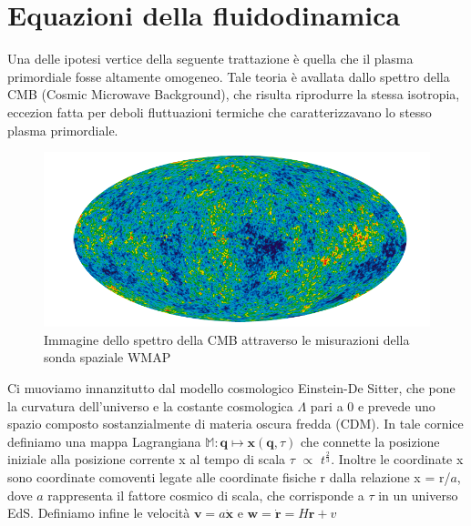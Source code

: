 \section{Equazioni della fluidodinamica}


Una delle ipotesi vertice della seguente trattazione è quella che il plasma primordiale fosse altamente omogeneo.
Tale teoria è avallata dallo spettro della CMB (Cosmic Microwave Background), che risulta riprodurre la stessa
isotropia, eccezion fatta per deboli fluttuazioni termiche che caratterizzavano lo stesso plasma primordiale.

\begin{center}
	\begin{figure}[H]
		\centering
		\includegraphics[scale=0.5, angle=0]{cmb.png}
		\caption{Immagine dello spettro della CMB attraverso le misurazioni della sonda spaziale WMAP}
		\label{fig:cmb}
	\end{figure}
\end{center}

Ci muoviamo innanzitutto dal modello cosmologico Einstein-De Sitter, che pone la curvatura dell'universo
e la costante cosmologica $\Lambda$ pari a 0 e prevede uno spazio composto sostanzialmente di materia
oscura fredda (CDM).
In tale cornice definiamo una mappa Lagrangiana $\mathbb{M}: \bm{q} \mapsto \bm{x}(\bm{q}, \tau)$ che connette la posizione
iniziale alla posizione corrente x al tempo di scala $\tau$ $\propto$ $t^{\frac{2}{3}}$.
Inoltre le coordinate x sono coordinate comoventi legate alle coordinate fisiche r dalla relazione
x = r/$a$, dove $a$ rappresenta il fattore cosmico di scala, che corrisponde a $\tau$ in un universo
EdS.
Definiamo infine le velocità $\bm{v} = a \dot{\bm{x}}$ e $\bm{w} = \dot{\bm{r}} = H \bm{r} + v$

